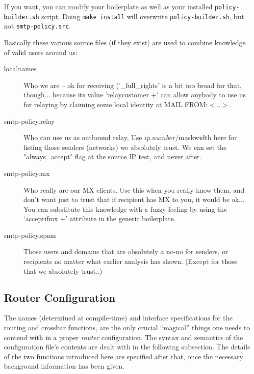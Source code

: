 If you want, you can modify your boilerplate as well as your
installed {\tt policy-builder.sh} script. Doing {\tt make install} will
overwrite {\tt policy-builder.sh}, but not {\tt smtp-policy.src}.



Basically these various source files (if they exist) are used to
combine knowledge of valid users around us:

\begin{description}
\item[localnames] \mbox{}

Who we are -- ok for receiving ('\_full\_rights'
is a bit too broad for that, though... because
its value 'relaycustomer +' can allow anybody
to use us for relaying by claiming some local
identity at MAIL FROM:{\(<\)}..{\(>\)}.



\item[smtp-policy.relay] \mbox{}

Who can use us as outbound relay,
Use  $ip.number$/maskwidth  here for listing
those senders (networks) we absolutely trust.
We can set the "always\_accept" flag at the
source IP test, and never after.



\item[smtp-policy.mx] \mbox{}

Who really are our MX clients.
Use this when you really know them, and don't
want just to trust that if recipient has MX
to you, it would be ok...
You can substitute this knowledge with a fuzzy
feeling by using the `acceptifmx +' attribute in
the generic boilerplate.



\item[smtp-policy.spam] \mbox{}

Those users and domains that are
absolutely a no-no for senders, or recipients
no matter what earlier analysis has shown.
(Except for those that we absolutely trust..)

\end{description}





\subsection{Router Configuration}



The names (determined at compile-time) and interface specifications for the
routing and crossbar functions, are the only crucial ``magical'' things one
needs to contend with in a proper {\em router\/} configuration.  The syntax and
semantics of the configuration file's contents are dealt with in the
following subsection. The details of the two functions introduced here are
specified after that, once the necessary background information has been
given.


